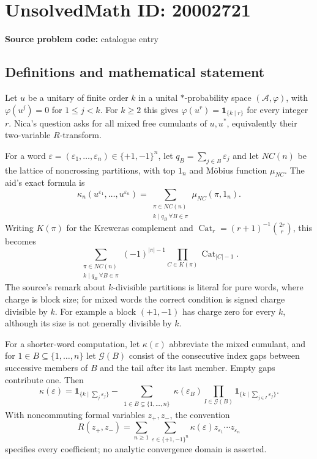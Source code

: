 \documentclass[11pt]{article}
\begin{document}
\section*{UnsolvedMath ID: 20002721}
\textbf{Source problem code:} catalogue entry
\subsection{Definitions and mathematical statement}
Let $u$ be a unitary of finite order $k$ in a unital $*$-probability space $(\mathcal A,\varphi)$, with $\varphi(u^j)=0$ for $1\le j<k$. For $k\ge2$ this gives $\varphi(u^r)=\mathbf1_{\{k\mid r\}}$ for every integer $r$. Nica's question asks for all mixed free cumulants of $u,u^*$, equivalently their two-variable $R$-transform.

For a word $\varepsilon=(\varepsilon_1,\ldots,\varepsilon_n)\in\{+1,-1\}^n$, let $q_B=\sum_{j\in B}\varepsilon_j$ and let $NC(n)$ be the lattice of noncrossing partitions, with top $1_n$ and M\"obius function $\mu_{NC}$. The aid's exact formula is
\[
 \kappa_n(u^{\varepsilon_1},\ldots,u^{\varepsilon_n})
   =\sum_{\substack{\pi\in NC(n)\\ k\mid q_B\ \forall B\in\pi}}
            \mu_{NC}(\pi,1_n).
\]
Writing $K(\pi)$ for the Kreweras complement and
$\operatorname{Cat}_r=(r+1)^{-1}\binom{2r}{r}$, this becomes
\[
 \sum_{\substack{\pi\in NC(n)\\ k\mid q_B\ \forall B\in\pi}}
    (-1)^{|\pi|-1}\prod_{C\in K(\pi)}\operatorname{Cat}_{|C|-1}.
\]
The source's remark about $k$-divisible partitions is literal for pure words, where charge is block size; for mixed words the correct condition is signed charge divisible by $k$. For example a block $(+1,-1)$ has charge zero for every $k$, although its size is not generally divisible by $k$.

For a shorter-word computation, let $\kappa(\varepsilon)$ abbreviate the mixed cumulant, and for $1\in B\subseteq\{1,\ldots,n\}$ let $\mathcal G(B)$ consist of the consecutive index gaps between successive members of $B$ and the tail after its last member. Empty gaps contribute one. Then
\[
 \kappa(\varepsilon)=\mathbf1_{\{k\mid\sum_j\varepsilon_j\}}
 -\sum_{\substack{1\in B\subsetneq\{1,\ldots,n\}}}
       \kappa(\varepsilon_B)
       \prod_{I\in\mathcal G(B)}
                      \mathbf1_{\{k\mid\sum_{j\in I}\varepsilon_j\}}.
\]
With noncommuting formal variables $z_+,z_-$, the convention
\[
 R(z_+,z_-)=\sum_{n\ge1}\sum_{\varepsilon\in\{+1,-1\}^n}
       \kappa(\varepsilon)z_{\varepsilon_1}\cdots z_{\varepsilon_n}
\]
specifies every coefficient; no analytic convergence domain is asserted.
\end{document}
